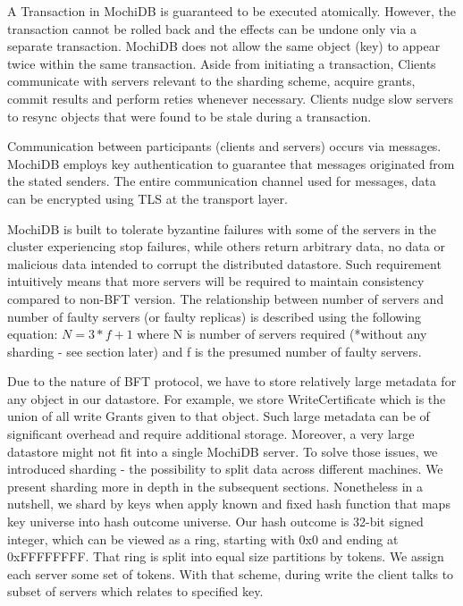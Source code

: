 \documentclass[letterpaper,twocolumn,10pt]{article}
\begin{document}
A Transaction in MochiDB is guaranteed to be executed atomically. However, the transaction cannot be rolled back and the effects can be undone only via a separate transaction. MochiDB does not allow the same object (key) to appear twice within the same transaction. Aside from initiating a transaction, Clients communicate with servers relevant to the sharding scheme, acquire grants, commit results and perform reties whenever necessary. Clients nudge slow servers to resync objects that were found to be stale during a transaction.

Communication between participants (clients and servers) occurs via messages. MochiDB employs key authentication to guarantee that messages originated from the stated senders. The entire communication channel used for messages, data can be encrypted using TLS at the transport layer.

MochiDB is built to tolerate byzantine failures with some of the servers in the cluster experiencing stop failures, while others return arbitrary data, no data or malicious data intended to corrupt the distributed datastore. Such requirement intuitively means that more servers will be required to maintain consistency compared to non-BFT version. The relationship between number of servers and number of faulty servers (or faulty replicas) is described using the following equation:
$N = 3*f + 1$  where N is number of servers required (*without any sharding - see section later) and f is the presumed number of faulty servers.

Due to the nature of BFT protocol, we have to store relatively large metadata for any object in our datastore. For example, we store WriteCertificate which is the union of all write Grants given to that object. Such large metadata can be of significant overhead and require additional storage. Moreover, a very large datastore might not fit into a single MochiDB server. To solve those issues, we introduced sharding - the possibility to split data across different machines. We present sharding more in depth in the subsequent sections. Nonetheless in a nutshell, we shard by keys when apply known and fixed hash function that maps key universe into hash outcome universe. Our hash outcome is 32-bit signed integer, which can be viewed as a ring, starting with 0x0 and ending at 0xFFFFFFFF. That ring is split into equal size partitions by tokens. We assign each server some set of tokens. With that scheme, during write the client talks to subset of servers which relates to specified key. 
\end{document}
